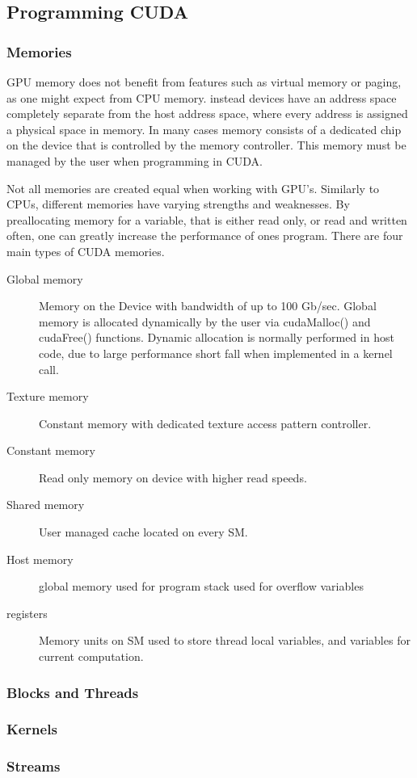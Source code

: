 \subsection{Programming CUDA}
\subsubsection{Memories}
GPU memory does not benefit from features such as virtual
memory or paging, as one might expect from CPU memory. instead devices have an
address space completely separate from the host address space, where every address is assigned a physical space in memory.
In many cases memory consists of a dedicated chip on the device that is controlled
by the memory controller.  This memory must be managed by the user when programming in CUDA.
\par
Not all memories are created equal when working with GPU's.  Similarly to \Glspl{CPU},
different memories have varying strengths and weaknesses.  By preallocating memory for a variable,
that is either read only, or read and written often, one can greatly increase the
performance of ones program.   %
There are four main types of CUDA memories.
\begin{description}
  \item [Global memory] Memory on the Device with bandwidth of up to 100 Gb/sec.
  Global memory is allocated dynamically by the user via cudaMalloc() and cudaFree() functions.
  Dynamic allocation is normally performed in host code, due to large performance short fall
  when implemented in a kernel call.
  \item [Texture memory] Constant memory with dedicated texture access pattern controller.

  \item [Constant memory] Read only memory on device with higher read speeds.
  \item [Shared memory] User managed cache located on every \Gls{SM}.
  \item [Host memory] global memory used for program stack used for overflow variables
  \item [registers] Memory units on \Gls{SM} used to store thread local variables,
                    and variables for current computation.
\end{description}

\subsubsection{Blocks and Threads}

\subsubsection{Kernels}



\subsubsection{Streams}

